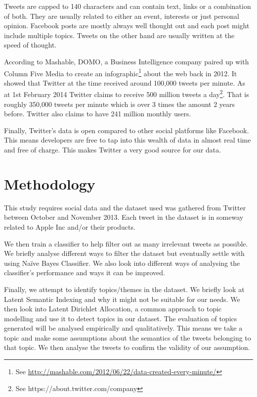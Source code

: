 Tweets are capped to 140 characters and can contain text, links or a combination of both. They are
usually related to either an event, interests or just personal opinion. Facebook posts are mostly
always well thought out and each post might include multiple topics. Tweets on the other hand are
usually written at the speed of thought.

According to Mashable, DOMO, a Business Intelligence company paired up with Column Five Media to
create an infographic\footnote{See \url{http://mashable.com/2012/06/22/data-created-every-minute/}}
about the web back in 2012. It showed that Twitter at the time received around 100,000 tweets per
minute. As at 1st February 2014 Twitter claims to receive 500 million tweets a day\footnote{See
https://about.twitter.com/company}. That is roughly 350,000 tweets per minute which is over 3 times
the amount 2 years before. Twitter also claims to have 241 million monthly users.

Finally, Twitter's data is open compared to other social platforms like Facebook. This means
developers are free to tap into this wealth of data in almost real time and free of charge. This
makes Twitter a very good source for our data.


\section{Methodology}
\label{sec:methodology}
This study requires social data and the dataset used was gathered from Twitter between October and
November 2013. Each tweet in the dataset is in someway related to Apple Inc and/or their products.

We then train a classifier to help filter out as many irrelevant tweets as possible. We briefly
analyse different ways to filter the dataset but eventually settle with using Na\"{i}ve Bayes
Classifier. We also look into different ways of analysing the classifier's performance and ways it
can be improved.

Finally, we attempt to identify topics/themes in the dataset. We briefly look at Latent Semantic
Indexing and why it might not be suitable for our needs. We then look into Latent Dirichlet
Allocation, a common approach to topic modelling and use it to detect topics in our dataset. The
evaluation of topics generated will be analysed empirically and qualitatively. This means we take a
topic and make some assumptions about the semantics of the tweets belonging to that topic. We then
analyse the tweets to confirm the validity of our assumption.

